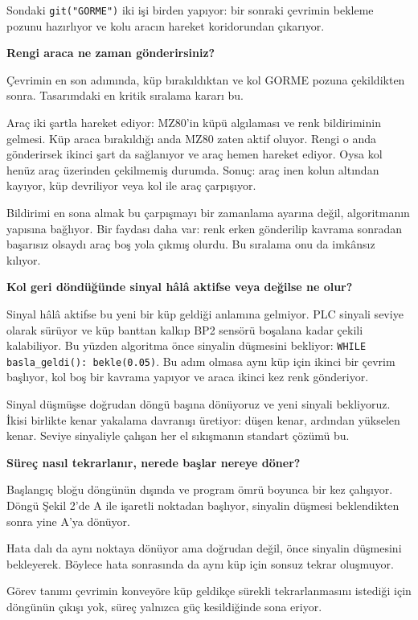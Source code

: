\documentclass[11pt,a4paper]{article}
\newcommand{\ey}[1]{\texttt{#1}}
\begin{document}
Sondaki \ey{git("GORME")} iki işi birden yapıyor: bir sonraki çevrimin bekleme
pozunu hazırlıyor ve kolu aracın hareket koridorundan çıkarıyor.

\textbf{Rengi araca ne zaman gönderirsiniz?}

Çevrimin en son adımında, küp bırakıldıktan ve kol GORME pozuna çekildikten
sonra. Tasarımdaki en kritik sıralama kararı bu.

Araç iki şartla hareket ediyor: MZ80'in küpü algılaması ve renk bildiriminin
gelmesi. Küp araca bırakıldığı anda MZ80 zaten aktif oluyor. Rengi o anda
gönderirsek ikinci şart da sağlanıyor ve araç hemen hareket ediyor. Oysa kol
henüz araç üzerinden çekilmemiş durumda. Sonuç: araç inen kolun altından
kayıyor, küp devriliyor veya kol ile araç çarpışıyor.

Bildirimi en sona almak bu çarpışmayı bir zamanlama ayarına değil, algoritmanın
yapısına bağlıyor. Bir faydası daha var: renk erken gönderilip kavrama
sonradan başarısız olsaydı araç boş yola çıkmış olurdu. Bu sıralama onu da
imkânsız kılıyor.

\textbf{Kol geri döndüğünde sinyal hâlâ aktifse veya değilse ne olur?}

Sinyal hâlâ aktifse bu yeni bir küp geldiği anlamına gelmiyor. PLC sinyali
seviye olarak sürüyor ve küp banttan kalkıp BP2 sensörü boşalana kadar çekili
kalabiliyor. Bu yüzden algoritma önce sinyalin düşmesini bekliyor:
\ey{WHILE basla\_geldi(): bekle(0.05)}. Bu adım olmasa aynı küp için ikinci bir
çevrim başlıyor, kol boş bir kavrama yapıyor ve araca ikinci kez renk
gönderiyor.

Sinyal düşmüşse doğrudan döngü başına dönüyoruz ve yeni sinyali bekliyoruz.
İkisi birlikte kenar yakalama davranışı üretiyor: düşen kenar, ardından
yükselen kenar. Seviye sinyaliyle çalışan her el sıkışmanın standart çözümü bu.

\textbf{Süreç nasıl tekrarlanır, nerede başlar nereye döner?}

Başlangıç bloğu döngünün dışında ve program ömrü boyunca bir kez çalışıyor.
Döngü Şekil 2'de A ile işaretli noktadan başlıyor, sinyalin düşmesi
beklendikten sonra yine A'ya dönüyor.

Hata dalı da aynı noktaya dönüyor ama doğrudan değil, önce sinyalin düşmesini
bekleyerek. Böylece hata sonrasında da aynı küp için sonsuz tekrar oluşmuyor.

Görev tanımı çevrimin konveyöre küp geldikçe sürekli tekrarlanmasını istediği
için döngünün çıkışı yok, süreç yalnızca güç kesildiğinde sona eriyor.
\end{document}
